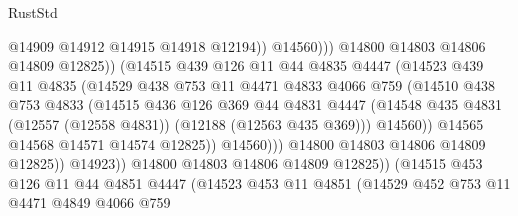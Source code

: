 \begin{lexlean}{RustStd}
\begin{coremodule}
                                      @14909
                                      @14912
                                      @14915
                                      @14918
                                      @12194))
                                  @14560)))
                            @14800
                            @14803
                            @14806
                            @14809
                            @12825))
                        (@14515
                          @439
                          @126
                          @11
                          @44
                          @4835
                          @4447
                          (@14523
                            @439
                            @11
                            @4835
                            (@14529
                              @438
                              @753
                              @11
                              @4471
                              @4833
                              @4066
                              @759
                              (@14510
                                @438
                                @753
                                @4833
                                (@14515
                                  @436
                                  @126
                                  @369
                                  @44
                                  @4831
                                  @4447
                                  (@14548
                                    @435
                                    @4831
                                    (@12557 (@12558 @4831))
                                    (@12188 (@12563 @435 @369)))
                                  @14560))
                              @14565
                              @14568
                              @14571
                              @14574
                              @12825))
                          @14560)))
                    @14800
                    @14803
                    @14806
                    @14809
                    @12825))
                @14923))
            @14800
            @14803
            @14806
            @14809
            @12825))
        (@14515
          @453
          @126
          @11
          @44
          @4851
          @4447
          (@14523
            @453
            @11
            @4851
            (@14529
              @452
              @753
              @11
              @4471
              @4849
              @4066
              @759

\end{coremodule}
\end{lexlean}
